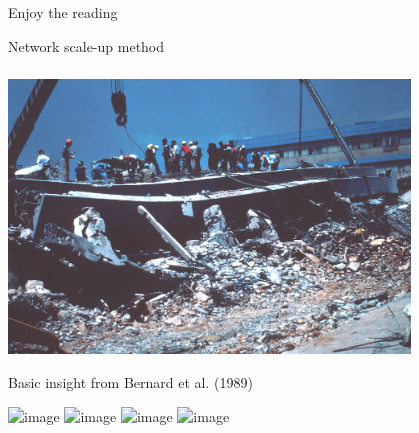 \documentclass[aspectratio=169]{beamer}
\begin{document}
\begin{frame}

{\Large
\begin{center}
Enjoy the reading
\end{center}
}

\end{frame}
\begin{frame}

\LARGE{Network scale-up method}

\end{frame}
\begin{frame}
\frametitle{}

\begin{center}
\includegraphics[width=0.8\textwidth]{figures/1985_Mexico_Earthquake_smaller.png}
\end{center}

Basic insight from Bernard et al. (1989)

\end{frame}
\begin{frame}

\begin{center}
\includegraphics<1>[width=0.6\textwidth]{figures/network-noedges}
\includegraphics<2>[width=0.6\textwidth]{figures/network-edges}
\includegraphics<3>[width=0.6\textwidth]{figures/network-edges-sample}
\includegraphics<4>[width=0.6\textwidth]{figures/network-edges-sample-ego}
\end{center}
\Large{
\begin{center}
\end{center}
}

\end{frame}
\end{document}
